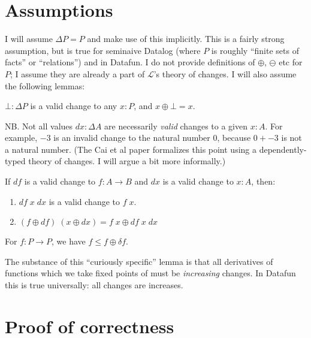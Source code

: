 \documentclass{rntz}
\newcommand{\mc}[1]{\ensuremath{\mathcal{#1}}}
\newcommand{\dv}{\delta}
\begin{document}

\section{Assumptions}

I will assume $\Delta P = P$ and make use of this implicitly. This is a fairly
strong assumption, but is true for seminaive Datalog (where $P$ is roughly
``finite sets of facts'' or ``relations'') and in Datafun. I do not provide
definitions of $\oplus$, $\ominus$ etc for $P$; I assume they are already a part
of $\mc{L}$'s theory of changes. I will also assume the following lemmas:

\begin{lemma}
  \label{lem:bot-change}
  $\bot : \Delta P$ is a valid change to any $x : P$, and $x \oplus \bot = x$.
\end{lemma}

NB. Not all values $dx : \Delta{A}$ are necessarily \emph{valid} changes to a
given $x : A$. For example, $-3$ is an invalid change to the natural number $0$,
because $0 + -3$ is not a natural number. (The Cai et al paper formalizes this
point using a dependently-typed theory of changes. I will argue a bit more
informally.)

\begin{lemma}
  \label{lem:fun-change}
  If $df$ is a valid change to $f : A \to B$ and $dx$ is a valid change to $x :
  A$, then:
  \begin{enumerate}
  \item $df\; x\; dx$ is a valid change to $f\;x$.
  \item \( (f \oplus df)\;(x \oplus dx) = f\;x \oplus df\;x\;dx \)
  \end{enumerate}
\end{lemma}

\begin{lemma}  \label{lem:curiously-specific}
  For $f : P \to P$, we have $f \le f \oplus \dv f$.
\end{lemma}

The substance of this ``curiously specific'' lemma is that all derivatives of
functions which we take fixed points of must be \emph{increasing} changes. In
Datafun this is true universally: all changes are increases.


\section{Proof of correctness}
\end{document}
